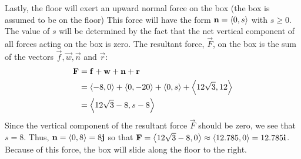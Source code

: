 \documentclass[handout]{ximera}
\begin{document}
\begin{example}[Example 6]
Lastly, the floor will exert an upward normal force on the box 
(the box is assumed to be on the floor)
This force will have the form $\mathbf{n} = \left\langle 0, s\right\rangle$ with $s \geq 0$. 
The value of $s$  will be determined by the fact that the net vertical component of all forces acting on the box is zero. 
The resultant force, $\vec{F}$, on the box is the sum of the vectors $\vec{f}, \vec{w}, \vec{n}$ and $\vec{r}$:
\begin{align*}
\mathbf{F} &= \mathbf{f} + \mathbf{w} + \mathbf{n} +  \mathbf{r} \\
         &= \left\langle -8,0\right\rangle + \left\langle 0,-20\right\rangle +\left\langle 0,s\right\rangle + \left\langle 12\sqrt 3, 12\right\rangle \\
         &= \left\langle 12\sqrt 3 -8 , s-8\right\rangle
\end{align*}
Since the vertical component of the resultant force $\vec{F}$ should be zero, we see that $s = 8$. 
Thus, $\mathbf{n} = \left\langle 0,8\right\rangle = 8\mathbf{j}$ so that $\mathbf{F} = \left\langle 12\sqrt 3 -8, 0\right\rangle \approx \left\langle 12.785,0\right\rangle = 12.785\mathbf{i}$. Because of this force, 
the box will slide along the floor to the right.





\end{example}
\end{document}
